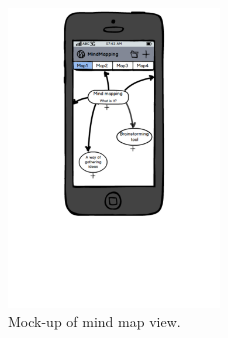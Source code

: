 \begin{figure}[h]
	\centering
	\includegraphics[width=0.5\textwidth]{graphics-mockup-map}
	\caption{Mock-up of mind map view.}
	\label{fig:mockup-mindmap}
\end{figure}
